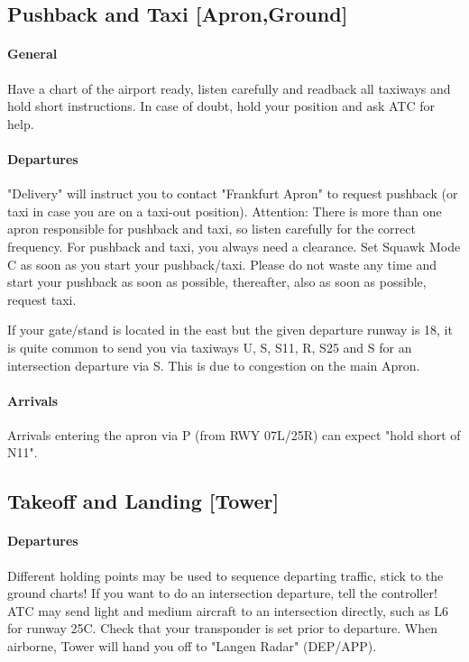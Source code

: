 \subsection[GND]{Pushback and Taxi [Apron,Ground]}
\paragraph{General}
Have a chart of the airport ready, listen carefully and readback all taxiways and hold short instructions. In case of doubt, hold your position and ask ATC for help.

\paragraph{Departures}
"Delivery" will instruct you to contact "Frankfurt Apron" to request pushback (or taxi in case you are on a taxi-out position). Attention: There is more than one apron responsible for pushback and taxi, so listen carefully for the correct frequency.
For pushback and taxi, you always need a clearance.
Set Squawk Mode C as soon as you start your pushback/taxi.
Please do not waste any time and start your pushback as soon as possible, thereafter, also as soon as possible, request taxi.

If your gate/stand is located in the east but the given departure runway is 18, it is quite common to send
you via taxiways U, S, S11, R, S25 and S for an intersection departure via S. This is due to congestion on the main Apron.

\paragraph{Arrivals}
Arrivals entering the apron via P (from RWY 07L/25R) can expect "hold short of N11".

\subsection[TWR]{Takeoff and Landing [Tower]}

\paragraph{Departures}
Different holding points may be used to sequence departing traffic, stick to the ground charts!
If you want to do an intersection departure, tell the controller! ATC may send light and medium
aircraft to an intersection directly, such as L6 for runway 25C.
Check that your transponder is set prior to departure.
When airborne, Tower will hand you off to "Langen Radar" (DEP/APP).

